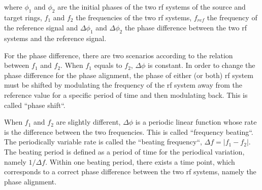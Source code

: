 where $\phi_1$ and $\phi_2$ are the initial phases of the two rf systems of the source and target rings, $f_1$ and $f_2$ the frequencies of the two rf systems, $f_\mathit{ref}$ the frequency of the reference signal and $\Delta \phi_1$ and $\Delta \phi_2$ the phase difference between the two rf systems and the reference signal. 

For the phase difference, there are two scenarios according to the relation between $f_1$ and $f_2$. When $f_1$ equals to $f_2$, $\Delta \phi$ is constant. In order to change the phase difference for the phase alignment, the phase of either (or both) rf system must be shifted by modulating the frequency of the rf system away from the reference value for a specific period of time and then modulating back. This is called ``phase shift``.

When $f_1$ and $f_2$ are slightly different, $\Delta \phi$ is a periodic linear function whose rate is the difference between the two frequencies. This is called ``frequency beating``. The periodically variable rate is called the ``beating frequency``, $\Delta f=|f_1-f_2|$. The beating period is defined as a period of time for the periodical variation, namely $1/\Delta f$. Within one beating period, there exists a time point, which corresponds to a correct phase difference between the two rf systems, namely the phase alignment. 

